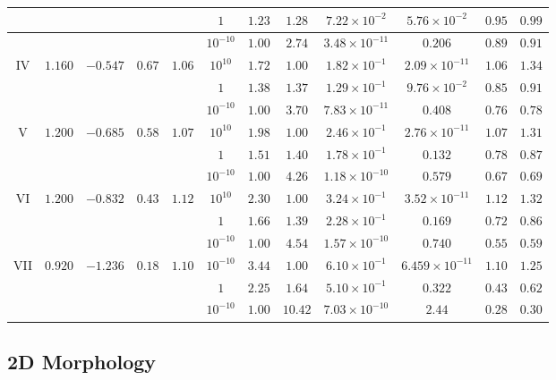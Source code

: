 \documentclass[twocolumn,aps,showpacs,showkeys,prd,superscriptaddress,byrevtex, amsmath]{revtex4-1}
\begin{document}
\begin{table}[t]
\begin{tabular}{c c c c c  c c c c c c c}
 \hline 
 &  &  &  &  & $1$ & $1.23$ & $1.28$ & $7.22 \times 10^{-2}$ & $5.76 \times 10^{-2}$ & $0.95$ & $0.99$ \\ 
 \hline 
 &  &  &  &  & $10^{-10}$ & $1.00$ & $2.74$ & $3.48 \times 10^{-11}$ & $0.206$ & $0.89$ & $0.91$\\ 
\hline  
IV & $1.160$ & $-0.547$ & $0.67$ & $1.06$ & $10^{10}$ & $1.72$ & $1.00$ & $1.82\times 10^{-1}$ & $2.09 \times 10^{-11}$ & $1.06$ & $1.34$ \\ 
\hline 
 &  &  &  &  & $1$ & $1.38$ & $1.37$ & $1.29 \times 10^{-1}$ & $9.76 \times 10^{-2}$ & $0.85$ & $0.91$\\ 
\hline 
 &  &  &  &  & $10^{-10}$ & $1.00$ & $3.70$ & $7.83 \times 10^{-11}$ & $0.408$ & $0.76$ & $0.78$ \\ 
\hline   
V & $1.200$ & $-0.685$ & $0.58$ & $1.07$ & $10^{10}$ & $1.98$ & $1.00$ & $2.46 \times 10^{-1}$ & $2.76 \times 10^{-11}$ & $1.07$ & $1.31$\\ 
\hline 
 &  &  &  &  & $1$ & $1.51$ & $1.40$ & $1.78 \times 10^{-1}$ & $0.132$ & $0.78$ & $0.87$ \\ 
\hline 
 &  &  &  &  & $10^{-10}$ & $1.00$ & $4.26$ & $1.18 \times 10^{-10}$ & $0.579$ & $0.67$ & $0.69$ \\ 
\hline   
VI & $1.200$ & $-0.832$ & $0.43$ & $1.12$ & $10^{10}$ & $2.30$ & $1.00$ & $3.24 \times 10^{-1}$ & $3.52 \times 10^{-11}$ & $1.12$ & $1.32$ \\ 
\hline 
 &  &  &  &  & $1$ & $1.66$ & $1.39$ & $2.28 \times 10^{-1}$ & $0.169$ & $0.72$ & $0.86$ \\ 
\hline 
 &  &  &  &  & $10^{-10}$ & $1.00$ & $4.54$ & $1.57 \times 10^{-10}$ & $0.740$ & $0.55$ & $0.59$ \\ 
\hline 
VII & $0.920$ & $-1.236$ & $0.18$ & $1.10$ & $10^{-10}$ & $3.44$ & $1.00$ & $6.10 \times 10^{-1}$ & $6.459 \times 10^{-11}$ & $1.10$ & $1.25$ \\ 
\hline 
 &  &  &  &  & $1$ & $2.25$ & $1.64$ & $5.10 \times 10^{-1}$ & $0.322$ & $0.43$ & $0.62$\\ 
\hline 
 &  &  &  &  & $10^{-10}$ & $1.00$ & $10.42$ & $7.03 \times 10^{-10}$ & $2.44$ & $0.28$ & $0.30$\\ 
\hline 
\end{tabular}
\end{table}

\subsection{2D Morphology}
\end{document}
